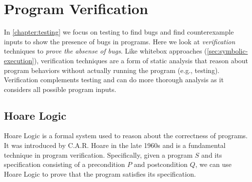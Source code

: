 \documentclass[oneside,11pt,dvipsnames]{book}
\begin{document}



\part{Program Verification}\label{chapter:verification}

In \autoref{chapter:testing} we focus on testing to find bugs and find counterexample inputs to show the presence of bugs in programs. Here we look at \emph{verification} techniques to \emph{prove the absense of bugs}. Like whitebox approaches (\autoref{sec:symbolic-execution}), verification techniques are a form of static analysis that reason about program behaviors without actually running the program (e.g., testing). Verification complements testing and can do more thorough analysis as it considers all possible program inputs.



\chapter{Hoare Logic}\label{sec:hoare-logic}

Hoare Logic is a formal system used to reason about the correctness of programs.  
It was introduced by C.A.R. Hoare in the late 1960s and is a fundamental technique in program verification. 
Specifically, given a program $S$ and its specification consisting of a precondition $P$ and postcondition $Q$, we can use Hoare Logic to prove that the program satisfies its specification. 
\end{document}
